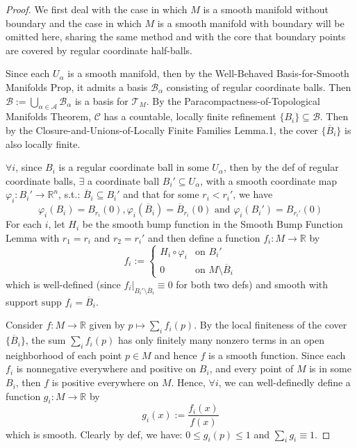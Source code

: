\begin{proof}
    We first deal with the case in which $M$ is a smooth manifold without boundary and the case in which $M$ is a smooth manifold with boundary will be omitted here, sharing the same method and with the core that boundary points are covered by regular coordinate half-balls.
    
    Since each $U_\alpha$ is a smooth manifold, then by the Well-Behaved Basis-for-Smooth Manifolds Prop, it admits a basis $\mathcal{B}_\alpha$ consisting of regular coordinate balls. Then $\mathcal{B}:= \bigcup_{\alpha \in \mathcal{A}} \mathcal{B}_\alpha$ is a basis for $\mathcal{T}_M$. By the Paracompactness-of-Topological Manifolds Theorem, $\mathcal{C}$ has a countable, locally finite refinement $\{B_i\} \subseteq \mathcal{B}$. Then by the Closure-and-Unions-of-Locally Finite Families Lemma.1, the cover $\{\overline{B}_i\}$ is also locally finite.

    $\forall i$, since $B_i$ is a regular coordinate ball in some $U_\alpha$, then by the def of regular coordinate balls, $\exists$ a coordinate ball $B_i' \subseteq U_\alpha$, with a smooth coordinate map $\varphi_i :B_i' \to \mathbb{R}^n$, s.t.: $\overline{B}_i \subseteq B_i'$ and that for some $r_i <r_i'$, we have
    \[
    \varphi_i(B_i)= B_{r_i} (0) ,\varphi_i(\overline{B}_i)= \overline{B}_{r_i} (0) \text{ and } \varphi_i(B_i')=B_{r_i'} (0)
    \]
    For each $i$, let $H_i$ be the smooth bump function in the Smooth Bump Function Lemma with $r_1=r_i$ and $r_2=r_i'$ and then define a function $f_i:M \to \mathbb{R}$ by
    \[
    f_i:= \begin{cases}
        H_i\circ \varphi_i &\text{on }B_i'\\
        0 &\text{on } M\setminus \overline{B}_i
    \end{cases}
    \]
    which is well-defined (since $f_i|_{B_i' \setminus \overline{B}_i} \equiv 0$ for both two defs) and smooth with support $\text{supp }f_i=\overline{B}_i$.

    Consider $f:M\to \mathbb{R}$ given by $p\mapsto \sum_i f_i(p)$. By the local finiteness of the cover $\{\overline{B}_i\}$, the sum $\sum_i f_i(p)$ has only finitely many nonzero terms in an open neighborhood of each point $p\in M$ and hence $f$ is a smooth function. Since each $f_i$ is nonnegative everywhere and positive on $B_i$, and every point of $M$ is in some $B_i$, then $f$ is positive everywhere on $M$. Hence, $\forall i$, we can well-definedly define a function $g_i:M\to \mathbb{R}$ by
    \[
    g_i(x):= \frac{f_i (x)}{f(x)}
    \]
    which is smooth. Clearly by def, we have: $0\leq g_i(p) \leq 1$ and $\sum_i g_i\equiv 1$.


\end{proof}
